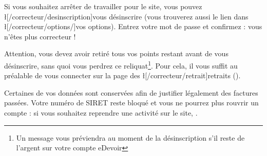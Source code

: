 ﻿Si vous souhaitez arrêter de travailler pour le site, vous pouvez \l[/correcteur/desinscription]{vous désinscrire} (vous trouverez aussi le lien dans \l[/correcteur/options/]{vos options}).
Entrez votre mot de passe et confirmez : vous n'êtes plus correcteur !

Attention, vous devez avoir retiré tous vos points restant avant de vous désinscrire, sans quoi vous perdrez ce reliquat\footnote{Un message vous préviendra au moment de la désinscription s'il reste de l'argent sur votre compte eDevoir}. Pour cela, il vous suffit au préalable de vous connecter sur la page des \l[/correcteur/retrait]{retraits} ().

Certaines de vos données sont conservées afin de justifier légalement des factures passées. Votre numéro de SIRET reste bloqué et vous ne pourrez plus rouvrir un compte : si vous souhaitez reprendre une activité sur le site, .